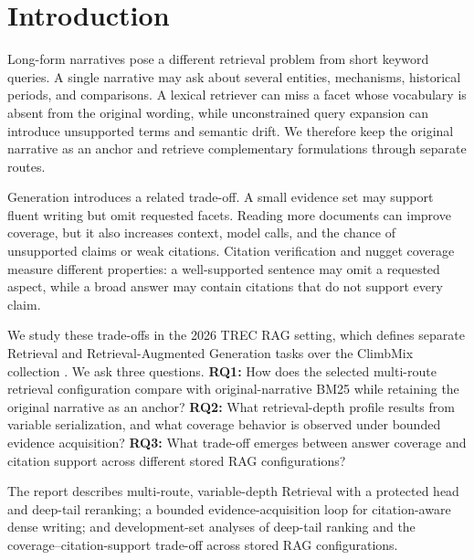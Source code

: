\section{Introduction}

Long-form narratives pose a different retrieval problem from short keyword queries. A single narrative may ask about several entities, mechanisms, historical periods, and comparisons. A lexical retriever can miss a facet whose vocabulary is absent from the original wording, while unconstrained query expansion can introduce unsupported terms and semantic drift. We therefore keep the original narrative as an anchor and retrieve complementary formulations through separate routes.

Generation introduces a related trade-off. A small evidence set may support fluent writing but omit requested facets. Reading more documents can improve coverage, but it also increases context, model calls, and the chance of unsupported claims or weak citations. Citation verification and nugget coverage measure different properties: a well-supported sentence may omit a requested aspect, while a broad answer may contain citations that do not support every claim.

We study these trade-offs in the 2026 TREC RAG setting, which defines separate Retrieval and Retrieval-Augmented Generation tasks over the ClimbMix collection \citep{trec_rag_website_2026,trec_rag_2026_guidelines}. We ask three questions. \textbf{RQ1:} How does the selected multi-route retrieval configuration compare with original-narrative BM25 while retaining the original narrative as an anchor? \textbf{RQ2:} What retrieval-depth profile results from variable serialization, and what coverage behavior is observed under bounded evidence acquisition? \textbf{RQ3:} What trade-off emerges between answer coverage and citation support across different stored RAG configurations?

The report describes multi-route, variable-depth Retrieval with a
protected head and deep-tail reranking; a bounded evidence-acquisition
loop for citation-aware dense writing; and development-set analyses of
deep-tail ranking and the coverage--citation-support trade-off across stored
RAG configurations.
\devnote

